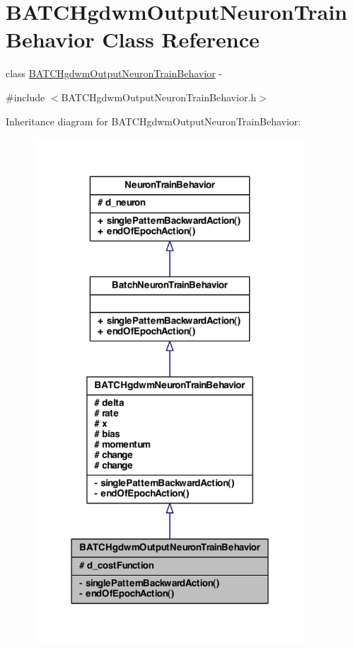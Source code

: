 \hypertarget{class_b_a_t_c_hgdwm_output_neuron_train_behavior}{
\section{BATCHgdwmOutputNeuronTrainBehavior Class Reference}
\label{class_b_a_t_c_hgdwm_output_neuron_train_behavior}
}


class \hyperlink{class_b_a_t_c_hgdwm_output_neuron_train_behavior}{BATCHgdwmOutputNeuronTrainBehavior} -\/  




{\ttfamily \#include $<$BATCHgdwmOutputNeuronTrainBehavior.h$>$}



Inheritance diagram for BATCHgdwmOutputNeuronTrainBehavior:
\nopagebreak
\begin{figure}[H]
\begin{center}
\leavevmode
\includegraphics[width=288pt]{class_b_a_t_c_hgdwm_output_neuron_train_behavior__inherit__graph}
\end{center}
\end{figure}


